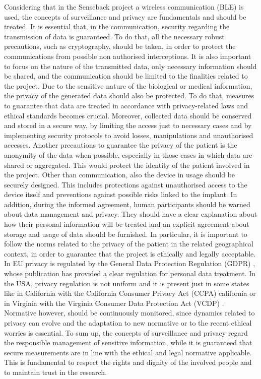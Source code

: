 \documentclass{Configuration_Files/PoliMi3i_thesis}
\begin{document}
Considering that in the Senseback project a wireless communication (BLE) is used, the concepts of surveillance and privacy are fundamentals and should be treated.
It is essential that, in the communication, security regarding the transmission of data is guaranteed. To do that, all the necessary robust precautions, such as cryptography, should be taken, in order to protect the communications from possible non authorised interceptions. It is also important to focus on the nature of the transmitted data, only necessary information should be shared, and the communication should be limited to the finalities related to the project.
Due to the sensitive nature of the biological or medical information, the privacy of the generated data should also be protected. To do that, measures to guarantee that data are treated in accordance with privacy-related laws and ethical standards becomes crucial. Moreover, collected data should be conserved and stored in a secure way, by limiting the access just to necessary cases and by implementing security protocols to avoid losses, manipulations and unauthorised accesses.
Another precautions to guarantee the privacy of the patient is the anonymity of the data when possible, especially in those cases in which data are shared or aggregated. This would protect the identity of the patient involved in the project.
Other than communication, also the device in usage should be securely designed. This includes protections against unauthorised access to the device itself and preventions against possible risks linked to the implant.
In addition, during the informed agreement, human participants should be warned about data management and privacy. They should have a clear explanation about how their personal information will be treated and an explicit agreement about storage and usage of data should be furnished. In particular, it is important to follow the norms related to the privacy of the patient in the related geographical context, in order to guarantee that the project is ethically and legally acceptable. In EU privacy is regulated by the General Data Protection Regulation (GDPR) \cite{L_2016119EN01000101Xml}, whose publication has provided a clear regulation for personal data treatment. In the USA, privacy regulation is not uniform and it is present just in some states like in California with the California Consumer Privacy Act (CCPA) \cite{californiaCaliforniaPrivacyProtection} california or in Virginia with the Virginia Consumer Data Protection Act (VCDP) \cite{CodeVirginiaCode}. Normative however, should be continuously monitored, since dynamics related to privacy can evolve and the adaptation to new normative or to the recent ethical worries is essential.
To sum up, the concepts of surveillance and privacy regard the responsible management of sensitive information, while it is guaranteed that secure measurements are in line with the ethical and legal normative applicable. This is fundamental to respect the rights and dignity of the involved people and to maintain trust in the research. 
\end{document}
